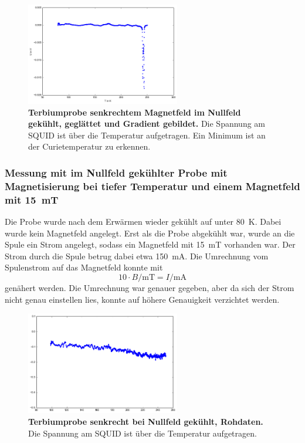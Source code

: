 \documentclass[a4paper,ngerman]{scrartcl}
\begin{document}
\begin{figure}
\centering
\includegraphics[width=0.6\textwidth]{abbildungen/Tb_sr_0_grad.png}
\caption[Terbiumprobe senkrecht bei Nullfeld]{\textbf{Terbiumprobe
    senkrechtem Magnetfeld im Nullfeld gekühlt, geglättet und Gradient gebildet.} Die Spannung am SQUID ist über die Temperatur aufgetragen. Ein Minimum ist an der Curietemperatur zu erkennen.}
\label{fig:Tb_sr_0_grad}
\end{figure}

\subsubsection*{Messung mit im Nullfeld gekühlter Probe mit Magnetisierung bei tiefer Temperatur und einem Magnetfeld mit \SI{15}{mT}}

Die Probe wurde nach dem Erwärmen wieder gekühlt auf unter \SI{80}{K}.
Dabei wurde kein Magnetfeld angelegt.
Erst als die Probe abgekühlt war, wurde an die Spule ein Strom angelegt, sodass ein Magnetfeld mit \SI{15}{mT} vorhanden war.
Der Strom durch die Spule betrug dabei etwa \SI{150}{\mA}.
Die Umrechnung vom Spulenstrom auf das Magnetfeld konnte mit 
\begin{equation}
10 \cdot B/\mathrm{mT} = I /\mathrm{mA}
\end{equation} 
genähert werden. 
Die Umrechnung war genauer gegeben, aber da sich der Strom nicht genau einstellen lies, konnte auf höhere Genauigkeit verzichtet werden.


\begin{figure}
\centering
\includegraphics[width=0.6\textwidth]{abbildungen/Tb_sr_0_mit.png}
\caption[Terbiumprobe senkrecht bei Nullfeld]{\textbf{Terbiumprobe senkrecht bei Nullfeld gekühlt, Rohdaten.} Die Spannung am SQUID ist über die Temperatur aufgetragen.}
\label{fig:Tb_sr_0_mit}
\end{figure}
\end{document}
